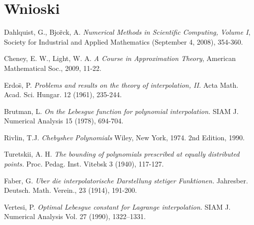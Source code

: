 \documentclass{article}
\begin{document}
\section{Wnioski}

\begin{thebibliography}{9}

Dahlquist, G., Bjo\"rck, A.
\emph{Numerical Methods in Scientific Computing, Volume I},
Society for Industrial and Applied Mathematics (September 4, 2008), 354-360.

Cheney, E. W., Light, W. A.
\emph{A Course in Approximation Theory},
American Mathematical Soc., 2009, 11-22.

Erdo\"s, P.
\emph{Problems and results on the theory of interpolation, II.}
Acta Math. Acad. Sci.
Hungar. 12 (1961), 235-244.

Brutman, L.
\emph{On the Lebesgue function for polynomial interpolation.}
SIAM J. Numerical Analysis 15 (1978), 694-704.

Rivlin, T.J.
\emph{Chebyshev Polynomials}
Wiley, New York, 1974. 2nd Edition, 1990.

Turetskii, A. H.
\emph{The bounding of polynomials prescribed at equally distributed points.}
Proc. Pedag. Inst. Vitebsk 3 (1940), 117-127.

Faber, G.
\emph{Uber die interpolatorische Darstellung stetiger Funktionen.}
Jahresber. Deutsch. Math. Verein., 23 (1914), 191-200.

Vertesi, P.
\emph{Optimal Lebesgue constant for Lagrange interpolation.}
SIAM J. Numerical Analysis Vol. 27 (1990), 1322–1331.

\end{thebibliography}
\end{document}

